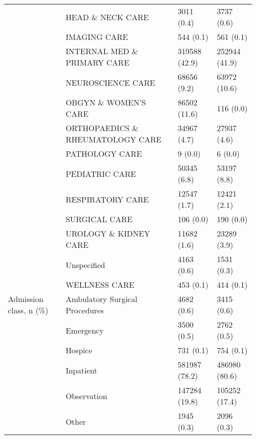 \begin{tabular}{llll}
                                       & HEAD \& NECK CARE &         3011 (0.4) &         3737 (0.6) \\
                                       & IMAGING CARE &          544 (0.1) &          561 (0.1) \\
                                       & INTERNAL MED \& PRIMARY CARE &      319588 (42.9) &      252944 (41.9) \\
                                       & NEUROSCIENCE CARE &        68656 (9.2) &       63972 (10.6) \\
                                       & OBGYN \& WOMEN'S CARE &       86502 (11.6) &          116 (0.0) \\
                                       & ORTHOPAEDICS \& RHEUMATOLOGY CARE &        34967 (4.7) &        27937 (4.6) \\
                                       & PATHOLOGY CARE &            9 (0.0) &            6 (0.0) \\
                                       & PEDIATRIC CARE &        50345 (6.8) &        53197 (8.8) \\
                                       & RESPIRATORY CARE &        12547 (1.7) &        12421 (2.1) \\
                                       & SURGICAL CARE &          106 (0.0) &          190 (0.0) \\
                                       & UROLOGY \& KIDNEY CARE &        11682 (1.6) &        23289 (3.9) \\
                                       & Unspecified &         4163 (0.6) &         1531 (0.3) \\
                                       & WELLNESS CARE &          453 (0.1) &          414 (0.1) \\
Admission class, n (\%) & Ambulatory Surgical Procedures &         4682 (0.6) &         3415 (0.6) \\
                                       & Emergency &         3500 (0.5) &         2762 (0.5) \\
                                       & Hospice &          731 (0.1) &          754 (0.1) \\
                                       & Inpatient &      581987 (78.2) &      486980 (80.6) \\
                                       & Observation &      147284 (19.8) &      105252 (17.4) \\
                                       & Other &         1945 (0.3) &         2096 (0.3) \\

\end{tabular}
